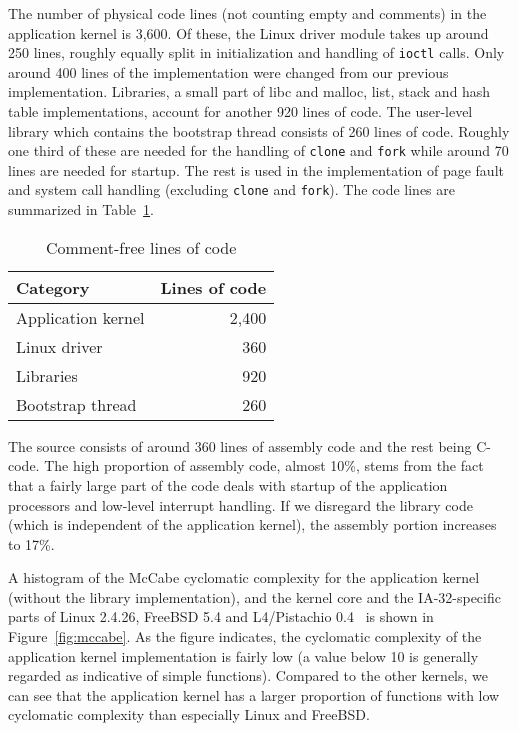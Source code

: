 The number of physical code lines (not counting empty and comments) in
the application kernel is 3,600. Of these, the Linux driver module takes up
around 250 lines, roughly equally split in initialization and handling of
\texttt{ioctl} calls. Only around 400 lines of the implementation were changed
from our previous implementation. Libraries, a small part of libc and
malloc, list, stack and hash table implementations, account for another 920
lines of code.  The user-level library which contains the bootstrap thread
consists of 260 lines of code. Roughly one third of these are needed for the
handling of \texttt{clone} and \texttt{fork} while around 70 lines are needed
for startup.  The rest is used in the implementation of page fault and system
call handling (excluding \texttt{clone} and \texttt{fork}). The code lines are
summarized in Table~\ref{tab:loc}.

\begin{table}
  \caption{Comment-free lines of code}
  \begin{center}
    \vspace{0.2cm}
    \label{tab:loc}
    \begin{small}
      \begin{tabular}{l|r}
        Category & Lines of code \\
        \hline
        Application kernel & 2,400 \\
        Linux driver & 360 \\
        Libraries  & 920 \\
        Bootstrap thread & 260 \\
      \end{tabular}
    \end{small}
  \end{center}
\end{table}

The source consists of around 360 lines of assembly code and the rest being
C-code. The high proportion of assembly code, almost 10\%, stems from the fact
that a fairly large part of the code deals with startup of the application
processors and low-level interrupt handling. If we disregard the library code
(which is independent of the application kernel), the assembly portion
increases to 17\%.

\label{fix:mccabe}A histogram of the McCabe cyclomatic complexity for the
application kernel (without the library implementation), and the kernel core
and the IA-32-specific parts of Linux 2.4.26, FreeBSD 5.4 and L4/Pistachio
0.4~\cite{l4ka03pistachio} is shown in Figure~\ref{fig:mccabe}. As the figure
indicates, the cyclomatic complexity of the application kernel implementation
is fairly low (a value below 10 is generally regarded as indicative of simple
functions). Compared to the other kernels, we can see that the application
kernel has a larger proportion of functions with low cyclomatic complexity
than especially Linux and FreeBSD.

